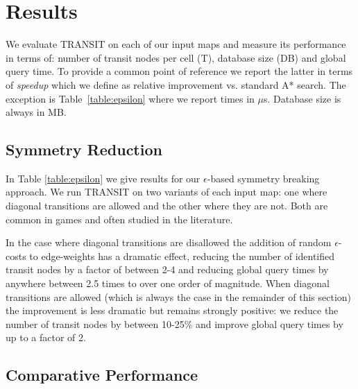 \section{Results}
\label{sec:results}

We evaluate TRANSIT on each of our
input maps and measure its performance in terms of:
number of transit nodes per cell (T), database size (DB)
and global query time.
To provide a common point of reference we report the latter
in terms of \emph{speedup} which we define
as relative improvement vs. standard A* search. The exception is Table~\ref{table:epsilon}
where we report times in $\mu$s.
Database size is always in MB.

\subsection{Symmetry Reduction}
In Table \ref{table:epsilon} we give results
for our $\epsilon$-based symmetry breaking approach.
We run TRANSIT on two variants of each input map:
one where diagonal transitions are allowed
and the other where they are not. Both are common in
games and often studied in the literature.

In the case where diagonal transitions are disallowed the
addition of random $\epsilon$-costs to edge-weights has a dramatic
effect, reducing the number of identified transit nodes by a
factor of between 2-4 and reducing global query times by anywhere
between 2.5 times to over one order of magnitude.
When diagonal transitions are allowed (which is always the case
in the remainder of this section)
the improvement is less dramatic but remains strongly positive:
we reduce the number of transit nodes by between 10-25\%
and improve global query times by up to a factor of 2.

\subsection{Comparative Performance}
\label{sec:results}

